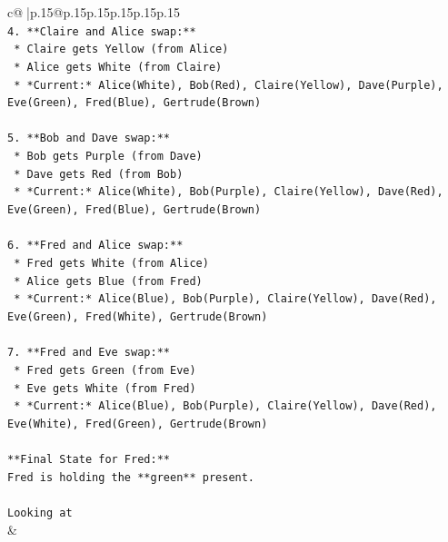 \documentclass{article}
\begin{document}
{\begin{supertabular}{c@{$\;$}|p{.15\linewidth}@{}p{.15\linewidth}p{.15\linewidth}p{.15\linewidth}p{.15\linewidth}p{.15\linewidth}}
{{{\\ 
\texttt{4.  **Claire and Alice swap:**} \\
\texttt{    *   Claire gets Yellow (from Alice)} \\
\texttt{    *   Alice gets White (from Claire)} \\
\texttt{    *   *Current:* Alice(White), Bob(Red), Claire(Yellow), Dave(Purple), Eve(Green), Fred(Blue), Gertrude(Brown)} \\
\\ 
\texttt{5.  **Bob and Dave swap:**} \\
\texttt{    *   Bob gets Purple (from Dave)} \\
\texttt{    *   Dave gets Red (from Bob)} \\
\texttt{    *   *Current:* Alice(White), Bob(Purple), Claire(Yellow), Dave(Red), Eve(Green), Fred(Blue), Gertrude(Brown)} \\
\\ 
\texttt{6.  **Fred and Alice swap:**} \\
\texttt{    *   Fred gets White (from Alice)} \\
\texttt{    *   Alice gets Blue (from Fred)} \\
\texttt{    *   *Current:* Alice(Blue), Bob(Purple), Claire(Yellow), Dave(Red), Eve(Green), Fred(White), Gertrude(Brown)} \\
\\ 
\texttt{7.  **Fred and Eve swap:**} \\
\texttt{    *   Fred gets Green (from Eve)} \\
\texttt{    *   Eve gets White (from Fred)} \\
\texttt{    *   *Current:* Alice(Blue), Bob(Purple), Claire(Yellow), Dave(Red), Eve(White), Fred(Green), Gertrude(Brown)} \\
\\ 
\texttt{**Final State for Fred:**} \\
\texttt{Fred is holding the **green** present.} \\
\\ 
\texttt{Looking at} \\
            }
        }
    }
    & \\ \\


\end{supertabular}}
\end{document}
